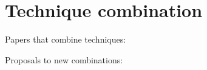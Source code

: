 \section{Technique combination}
\label{sec:comb}

Papers that combine techniques:


Proposals to new combinations: